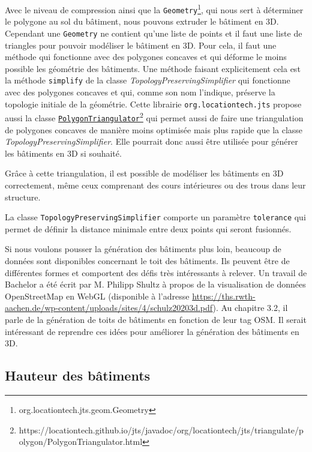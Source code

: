 Avec le niveau de compression ainsi que la \texttt{Geometry}\footnote{org.locationtech.jts.geom.Geometry}, qui nous sert à déterminer le polygone au sol du bâtiment, nous pouvons extruder le bâtiment en 3D. Cependant une \texttt{Geometry} ne contient qu'une liste de points et il faut une liste de triangles pour pouvoir modéliser le bâtiment en 3D. Pour cela, il faut une méthode qui fonctionne avec des polygones concaves et qui déforme le moins possible les géométrie des bâtiments. Une méthode faisant explicitement cela est la méthode \texttt{simplify} de la classe \textit{TopologyPreservingSimplifier} qui fonctionne avec des polygones concaves et qui, comme son nom l'indique, préserve la topologie initiale de la géométrie. Cette librairie \texttt{org.locationtech.jts} propose aussi la classe \href{https://locationtech.github.io/jts/javadoc/org/locationtech/jts/triangulate/polygon/PolygonTriangulator.html}{\texttt{PolygonTriangulator}}\footnote{https://locationtech.github.io/jts/javadoc/org/locationtech/jts/triangulate/polygon/PolygonTriangulator.html} qui permet aussi de faire une triangulation de polygones concaves de manière moins optimisée mais plus rapide que la classe \textit{TopologyPreservingSimplifier}. Elle pourrait donc aussi être utilisée pour générer les bâtiments en 3D si souhaité.

Grâce à cette triangulation, il est possible de modéliser les bâtiments en 3D correctement, même ceux comprenant des cours intérieures ou des trous dans leur structure.

La classe \texttt{TopologyPreservingSimplifier} comporte un paramètre \texttt{tolerance} qui permet de définir la distance minimale entre deux points qui seront fusionnés.

Si nous voulons pousser la génération des bâtiments plus loin, beaucoup de données sont disponibles concernant le toit des bâtiments. Ils peuvent être de différentes formes et comportent des défis très intéressants à relever. Un travail de Bachelor a été écrit par M. Philipp Shultz à propos de la visualisation de données OpenStreetMap en WebGL (disponible à l'adresse \href{https://ths.rwth-aachen.de/wp-content/uploads/sites/4/schulz20203d.pdf}{https://ths.rwth-aachen.de/wp-content/uploads/sites/4/schulz20203d.pdf}). Au chapitre 3.2, il parle de la génération de toits de bâtiments en fonction de leur tag OSM. Il serait intéressant de reprendre ces idées pour améliorer la génération des bâtiments en 3D.

\newpage
\subsection{Hauteur des bâtiments}

